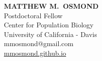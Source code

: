 \documentclass[12pt]{article}
\begin{document}
\thispagestyle{empty} 
\pagestyle{fancy}

{\raggedleft
\noindent\Large{\textbf{MATTHEW M.\ OSMOND}}\\
\large Postdoctoral Fellow\\
\large Center for Population Biology\\
\large University of California - Davis \\
\large mmosmond@gmail.com\\
\href{https://mmosmond.github.io}{mmosmond.github.io}\\
}



%
\end{document}
